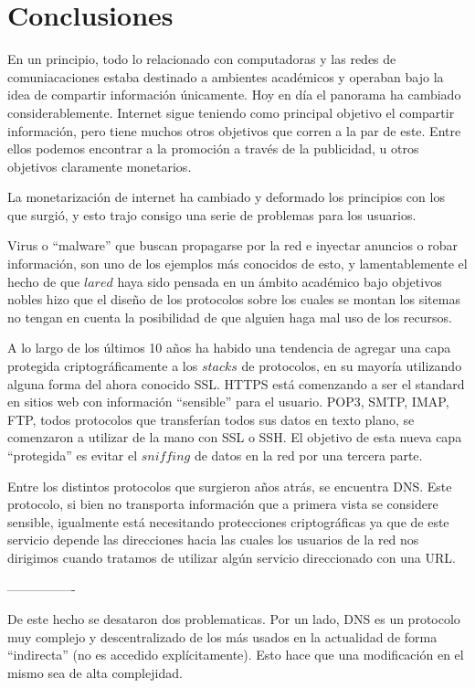 \chapter{Conclusiones}

En un principio, todo lo relacionado con computadoras y las redes de
comuniacaciones estaba destinado a ambientes acad\'emicos y operaban bajo la
idea de compartir informaci\'on \'unicamente. Hoy en d\'ia el panorama ha
cambiado considerablemente. Internet sigue teniendo como principal objetivo el
compartir informaci\'on, pero tiene muchos otros objetivos que corren a la par
de este. Entre ellos podemos encontrar a la promoci\'on a trav\'es de la
publicidad, u otros objetivos claramente monetarios.

La monetarizaci\'on de internet ha cambiado y deformado los principios con los
que surgi\'o, y esto trajo consigo una serie de problemas para los usuarios.

Virus o ``malware'' que buscan propagarse por la red e inyectar anuncios o robar
informaci\'on, son uno de los ejemplos m\'as conocidos de esto, y
lamentablemente el hecho de que $la red$ haya sido pensada en un \'ambito
acad\'emico bajo objetivos nobles hizo que el diseño de los protocolos sobre
los cuales se montan los sitemas no tengan en cuenta la posibilidad de que
alguien haga mal uso de los recursos.

A lo largo de los \'ultimos 10 a\~nos ha habido una tendencia de agregar una
capa protegida criptogr\'aficamente a los $stacks$ de protocolos, en su
mayor\'ia utilizando alguna forma del ahora conocido SSL. HTTPS est\'a
comenzando a ser el standard en sitios web con informaci\'on ``sensible'' para
el usuario. POP3, SMTP, IMAP, FTP, todos protocolos que transfer\'ian todos sus
datos en texto plano, se comenzaron a utilizar de la mano con SSL o SSH. El
objetivo de esta nueva capa ``protegida'' es evitar el $sniffing$ de datos en
la red por una tercera parte.

Entre los distintos protocolos que surgieron años atr\'as, se encuentra DNS.
Este protocolo, si bien no transporta informaci\'on que a primera vista se
considere sensible, igualmente est\'a necesitando protecciones
criptogr\'aficas ya que de este servicio depende las direcciones hacia las
cuales los usuarios de la red nos dirigimos cuando tratamos de utilizar alg\'un
servicio direccionado con una URL.

----------------

De este hecho se desataron dos problematicas. Por un lado, DNS es un protocolo
muy complejo y descentralizado de los m\'as usados en la actualidad de forma
``indirecta'' (no es accedido expl\'icitamente). Esto hace que una
modificaci\'on en el mismo sea de alta complejidad.

